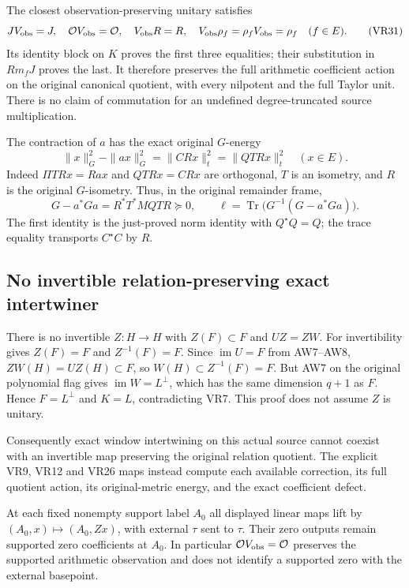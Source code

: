 The closest observation-preserving unitary satisfies
\[
 JV_{\rm obs}=J,\quad \mathcal OV_{\rm obs}=\mathcal O,\quad
 V_{\rm obs}R=R,\quad
 V_{\rm obs}\rho_f=\rho_fV_{\rm obs}=\rho_f\quad(f\in E).
 \tag{VR31}
\]
Its identity block on \(K\) proves the first three equalities; their substitution in \(Rm_fJ\) proves the last. It therefore preserves the full arithmetic coefficient action on the original canonical quotient, with every nilpotent and the full Taylor unit. There is no claim of commutation for an undefined degree-truncated source multiplication.

The contraction of \(a\) has the exact original \(G\)-energy
\[
 \|x\|_G^2-\|ax\|_G^2
 =\|C R x\|_t^2=\|QT R x\|_t^2\quad(x\in E). \tag{VR32}
\]
Indeed \(\Pi TRx=Rax\) and \(QTRx=CRx\) are orthogonal, \(T\) is an isometry, and \(R\) is the original \(G\)-isometry. Thus, in the original remainder frame,
\[
 G-a^*Ga=R^*T^*MQTR\succeq0,\qquad
 \ell=\operatorname{Tr}\bigl(G^{-1}(G-a^*Ga)\bigr).
 \tag{VR33}
\]
The first identity is the just-proved norm identity with \(Q^\star Q=Q\); the trace equality transports \(C^\star C\) by \(R\).

\subsection{No invertible relation-preserving exact intertwiner}

There is no invertible \(Z:H\to H\) with \(Z(F)\subset F\) and \(UZ=ZW\). For invertibility gives \(Z(F)=F\) and \(Z^{-1}(F)=F\). Since \(\operatorname{im}U=F\) from AW7--AW8,
\(ZW(H)=UZ(H)\subset F\), so \(W(H)\subset Z^{-1}(F)=F\).
But AW7 on the original polynomial flag gives \(\operatorname{im}W=L^\perp\), which has the same dimension \(q+1\) as \(F\). Hence \(F=L^\perp\) and \(K=L\), contradicting VR7. This proof does not assume \(Z\) is unitary.

Consequently exact window intertwining on this actual source cannot coexist with an invertible map preserving the original relation quotient. The explicit VR9, VR12 and VR26 maps instead compute each available correction, its full quotient action, its original-metric energy, and the exact coefficient defect.

At each fixed nonempty support label \(A_0\) all displayed linear maps lift by \((A_0,x)\mapsto(A_0,Zx)\), with external \(\tau\) sent to \(\tau\). Their zero outputs remain supported zero coefficients at \(A_0\). In particular \(\mathcal O V_{\rm obs}=\mathcal O\) preserves the supported arithmetic observation and does not identify a supported zero with the external basepoint.
